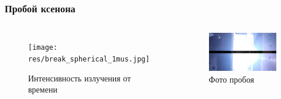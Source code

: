 \documentclass{beamer}
\begin{document}
	\begin{frame}
		\frametitle{Пробой ксенона}
		\begin{columns}
			\begin{figure}
				\centering
				\texttt{[image: res/break\_spherical\_1mus.jpg]}
				\caption*{Интенсивность излучения от времени}
			\end{figure}	
			\begin{figure}
				\centering
				\includegraphics[width=\linewidth]{res/spark_spherical_xe.png}
				\caption*{Фото пробоя}
			\end{figure}
		\end{columns}
	\end{frame}	
\end{document}

